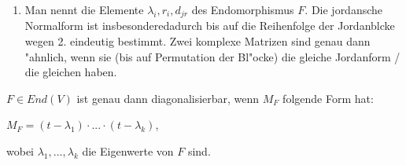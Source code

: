 \documentclass[8pt, a4paper, twocolumn, landscape]{article}
\newcommand{\comment}[1]{}
\begin{document}
\begin{theorem}
\begin{enumerate}
{Es gilt $1 \leq d_i \leq \mu (M_F, \lambda_i)$ f\uee r $\forall i$.  Der gr\oee sste Jordanblock hat dabei genau die Gr\oee sse $\mu (M_F, \lambda_i)$.
}

\item Man nennt die Elemente $\lambda_i, r_i, d_{jr}$  des Endomorphismus $F$. Die jordansche Normalform ist insbesonderedadurch  bis auf die Reihenfolge der Jordanbl\oee cke wegen 2. eindeutig bestimmt. Zwei komplexe Matrizen sind genau dann "ahnlich, wenn sie (bis auf Permutation der Bl"ocke) die gleiche Jordanform / die gleichen  haben.
\end{enumerate}
\end{theorem}

\begin{corollary}
$F \in End(V)$ ist genau dann diagonalisierbar, wenn $M_F$ folgende Form hat:
\\ \centerline{$M_F = (t - \lambda_1) \cdot ... \cdot (t - \lambda_k)$,}
wobei $\lambda_1, ... , \lambda_k$ die Eigenwerte von $F$ sind.
\end{corollary}


\comment{
\begin{remark}
\bt{Rechenverfahren zur Bestimmung einer Jordan-Normalform} 
\begin{enumerate}
\item Bestimme die Eigenwerte $\lambda_1, ... \lambda_k$ der Matrix $A \in M(n \times n; K)$.
\item Bestimme die Anzahl und Gr\oee sse der Jordanbl\oee cke:

Sei $U = A - \lambda_i E_n$.
Sei $q= min\{l \ | \ dim(Ker(U^l)) = dim(Ker(U^{l+1})\}$ und $s_j^{(i)} = dim(Ker(U^j))$ mit $j \leq q$.
Die Anzahl der Jordanbl\oee cke der Gr\oee sse $j$ zum Eigenwert $\lambda_i$ ist dann gegeben durch 
\\ \centerline{$s_j^{(i)} - s_{j-1}^{(i)} +s_{j+1}^{(i)}.$}
\\
\\
\\ \textit{Kommentar :} Die Anzahl der Jordanbl\oee cke zu $\lambda_i$ ist gegeben durch die geometrische Vielfachheit von $\lambda_i$.
\item Eine jordansche Normalform l\aee sst sich anhand dieser Parameter aufstellen.
\end{enumerate}
\end{remark}
}
\end{document}
